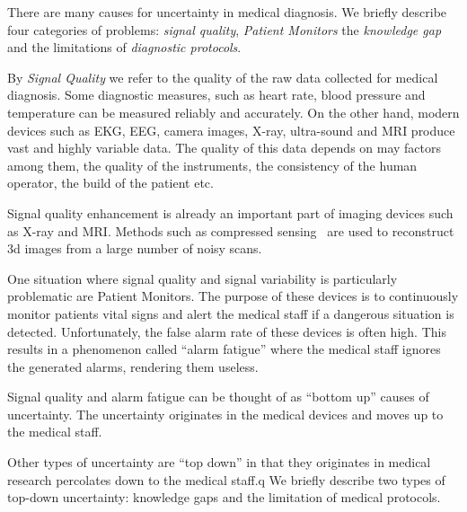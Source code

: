 \documentclass[11pt]{pnas-new}
\begin{document}
\iffalse
It is certainly expected that physicians can achieve a reliable
decision making, probably with sufficient clinical information
\cite{mehta2011agreement} or if only the major information is needed
\cite{atiya2003interobserver}. However, in many cases, the quality of
decision making might be jeopardized due to various reasons, among
which the uncertainty in medicine is non-negligible.
\yoav{I find the previous paragraph unclear and confusing, We should
  talk about it}
\fi

There are many causes for uncertainty in medical diagnosis. We briefly
describe four categories of problems: {\em signal quality}, {\em
  Patient Monitors} the {\em knowledge gap} and the limitations of {\em
  diagnostic protocols}.


By {\em Signal Quality} we refer to the quality of the raw data
collected for medical diagnosis. Some diagnostic measures, such
as heart rate, blood pressure and temperature can be measured reliably
and accurately. On the other hand, modern
devices such as EKG, EEG, camera images, X-ray, ultra-sound and MRI
produce vast and highly variable data. The quality of this data
depends on may factors among them, the quality of the instruments, the
consistency of the human operator, the build of the patient etc.

Signal quality enhancement is already an important part of imaging
devices such as X-ray and MRI. Methods such as compressed
sensing~\cite{} are used to reconstruct 3d images from a large number
of noisy scans.


One situation where signal quality and signal variability is
particularly problematic are Patient Monitors. The purpose of these
devices is to continuously monitor patients vital signs and alert the
medical staff if a dangerous situation is detected. Unfortunately, the
false alarm rate of these devices is often high. This results in a
phenomenon called ``alarm fatigue'' where the medical staff ignores
the generated alarms, rendering them useless.

Signal quality and alarm fatigue can be thought of as ``bottom up''
causes of uncertainty. The uncertainty originates in the medical
devices and moves up to the medical staff.

Other types of uncertainty are ``top down'' in that they originates in medical research percolates down to the medical staff.q We briefly
describe two types of top-down uncertainty: knowledge gaps and the
limitation of medical protocols.
\end{document}
